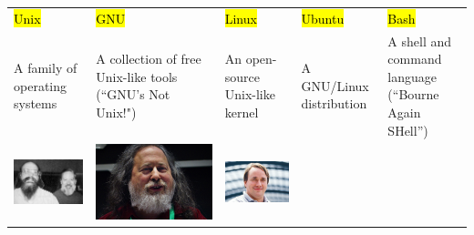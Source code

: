 \documentclass[10pt, aspectratio=169]{beamer}
\begin{document}
\begin{frame}[fragile]
  \vfill
  \begin{tabular}{%
    >{\RaggedRight\arraybackslash}p{}%
    >{\RaggedRight\arraybackslash}p{}%
    >{\RaggedRight\arraybackslash}p{}%
    >{\RaggedRight\arraybackslash}p{}%
    >{\RaggedRight\arraybackslash}p{}%
  }
    \hl{Unix} &
    \hl{GNU} &
    \hl{Linux} &
    \hl{Ubuntu} &
    \hl{Bash} \\    
    \addlinespace[2mm]
    A family of operating systems &
    A collection of free Unix-like tools (``GNU's Not Unix!") &
    An open-source Unix-like kernel &
    A GNU/Linux distribution &
    A shell and command language (``Bourne Again SHell'') \\
    \addlinespace[8mm]
    \includegraphics[height=0.175\textheight]{img/thompson_and_ritchie.jpg} &
    \includegraphics[height=0.175\textheight]{img/stallman.jpg} &
    \includegraphics[height=0.175\textheight]{img/torvalds.jpeg} &

\end{tabular}
\end{frame}
\end{document}
